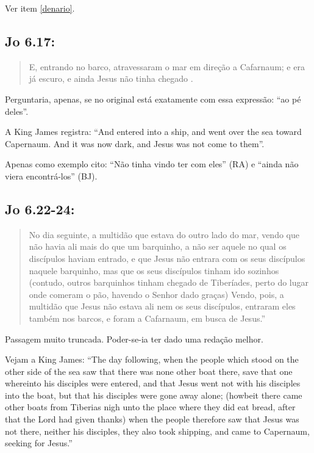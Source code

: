 Ver item \ref{denario}.

\subsection{Jo 6.17:}
\begin{quote}
    \small
E, entrando no barco, atravessaram o mar em direção a Cafarnaum; e era já escuro, e ainda Jesus não tinha chegado .
\end{quote}

Perguntaria, apenas, se no original está exatamente com essa expressão: ``ao pé deles''.

A King James registra: ``And entered into a ship, and went over the sea toward Capernaum. And it was now dark, and Jesus was not come to them''.

Apenas como exemplo cito: ``Não tinha vindo ter com eles'' (RA) e ``ainda não viera encontrá-los'' (BJ).

\subsection{Jo 6.22-24:}
\begin{quote}
    \small
No dia seguinte, a multidão que estava do outro lado do mar, vendo que não havia ali mais do que um barquinho, a não ser aquele no qual os discípulos haviam entrado, e que Jesus não entrara com os seus discípulos naquele barquinho, mas que os seus discípulos tinham ido sozinhos (contudo, outros barquinhos tinham chegado de Tiberíades, perto do lugar onde comeram o pão, havendo o Senhor dado graças) Vendo, pois, a multidão que Jesus não estava ali nem os seus discípulos, entraram eles também nos barcos, e foram a Cafarnaum, em busca de Jesus.''
\end{quote}

Passagem muito truncada. Poder-se-ia ter dado uma redação melhor.

Vejam a King James: ``The day following, when the people which stood on the other side of the sea saw that there was none other boat there, save that one whereinto his disciples were entered, and that Jesus went not with his disciples into the boat, but that his disciples were gone away alone; (howbeit there came other boats from Tiberias nigh unto the place where they did eat bread, after that the Lord had given thanks) when the people therefore saw that Jesus was not there, neither his disciples, they also took shipping, and came to Capernaum, seeking for Jesus.''

